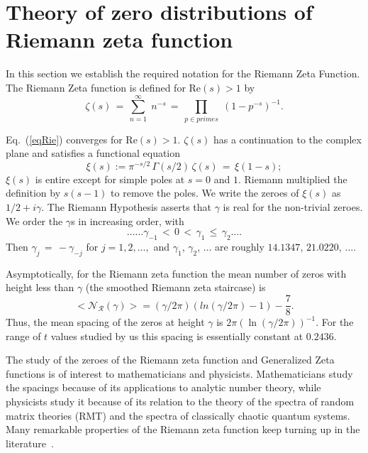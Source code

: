 \documentclass[twoside]{article}
\begin{document}
\section{\label{sec2}Theory of zero distributions of Riemann zeta function }

In this section we  establish the required notation for the 
Riemann Zeta Function. 
The Riemann Zeta function is defined for $\mathrm{Re} (s) > 1$ by
\begin{equation}
\zeta ( s ) \, = \, \sum^{\infty}_{n = 1} \; n^{-s} \, = \, \prod_{p \in primes} \;
\left( 1 - p^{-s} \right)^{-1}.
\label{eqRie}
\end{equation}

Eq.~(\ref{eqRie})  converges for $\mathrm{Re} (s) > 1$.  
 $\zeta ( s )$ has a  continuation
to the complex plane and satisfies a functional equation \cite{Riemann(1858),Riemann(1892),Titchmarsh(1986),Edwards(1974)}
\begin{equation}  
\xi(s):= \pi^{-s/2} \, \Gamma (s/2) \, \zeta ( s ) \, = \, \xi ( 1 - s );
\label{eq:func}
\end{equation}
$\xi(s)$ is entire except for simple poles at $s = 0$ and $1$. Riemann
multiplied the definition by $s(s-1)$ to remove the poles. We
write the zeroes of $\xi(s)$ as $1/2 + i \gamma$. The Riemann Hypothesis  
asserts that $\gamma$ is real for the non-trivial zeroes.
We order the $\gamma$s in increasing order, with 
\begin{equation}
\ldots \ldots \gamma_{-1} \, < \, 0 \, < \, 
\gamma_1 \, \leq \, \gamma_2 \ldots. 
\end{equation}
Then $\gamma_j \, = \, - \gamma_{-j}$ for $j = 1, 2, \ldots,$ 
and    $\gamma_1$, $\gamma_2$, $\ldots$  are roughly
$14.1347$, $21.0220$, $\ldots$.


Asymptotically, for the Riemann zeta function the mean number of 
zeros with height less than $\gamma$ (the smoothed Riemann zeta staircase)
is~\cite{Edwards(1974)}
\begin{equation}  
<\mathcal{N_R} (\gamma)> = (\gamma/2\pi)(ln(\gamma/2\pi)-1)-\frac{7}{8}.
\label{eq:Rnumber}
\end{equation}
Thus, the mean spacing of the zeros at height $\gamma$ is 
$2\pi(\ln (\gamma/2\pi))^{-1}$. For the range of $t$ values
studied by us this spacing is essentially constant at $0.2436$.

The study of the zeroes of the Riemann zeta function and Generalized 
Zeta functions is of interest to mathematicians and physicists. Mathematicians 
study the spacings because of its applications to analytic number theory, 
while physicists study it because of its  relation 
to the theory of the spectra of random matrix theories (RMT) 
and the spectra of classically chaotic quantum systems. 
Many remarkable properties of the Riemann zeta function keep turning up in the literature~\cite{os6,Matiyasevich}.
\end{document}
